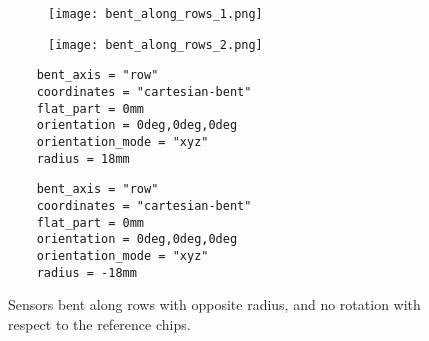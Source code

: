     
    
    \begin{figure}[!htp]
    \centering
    \begin{subfigure}{.45\textwidth}
      \centering
      \texttt{[image: bent\_along\_rows\_1.png]}
      \caption{}
      \label{fig:upstream}
    \end{subfigure}%
    \begin{subfigure}{.45\textwidth}
      \centering
      \texttt{[image: bent\_along\_rows\_2.png]}
      \caption{}
      \label{fig:downstream}
    \end{subfigure}
    \begin{multicols}{2}
    \begin{verbatim}
    bent_axis = "row"
    coordinates = "cartesian-bent"
    flat_part = 0mm
    orientation = 0deg,0deg,0deg
    orientation_mode = "xyz"
    radius = 18mm
    \end{verbatim}
    \begin{verbatim}
    bent_axis = "row"
    coordinates = "cartesian-bent"
    flat_part = 0mm
    orientation = 0deg,0deg,0deg
    orientation_mode = "xyz"
    radius = -18mm
    \end{verbatim}
    \end{multicols}
    \caption{Sensors bent along rows with opposite radius, \protect{} and no rotation with respect to the reference chips.}
    \label{fig:rotated_sensors_along_rows}
    \end{figure}
    
    
    
